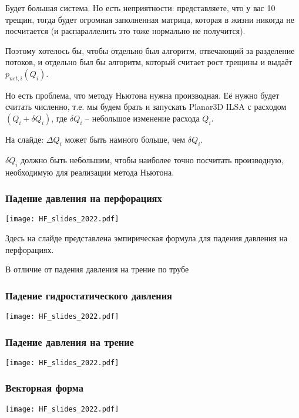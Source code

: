 \documentclass[main.tex]{subfiles}
\begin{document}
Будет большая система.
Но есть неприятности: представляете, что у вас 10 трещин, тогда будет огромная заполненная матрица, которая в жизни никогда не посчитается (и распараллелить это тоже нормально не получится).

Поэтому хотелось бы, чтобы отдельно был алгоритм, отвечающий за разделение потоков, и отдельно был бы алгоритм, который считает рост трещины и выдаёт $p_{net,i}(Q_i)$.

Но есть проблема, что методу Ньютона нужна производная.
Её нужно будет считать численно, т.е. мы будем брать и запускать Planar3D ILSA с расходом $\left(Q_i+\delta Q_i\right)$, где $\delta Q_i$ -- небольшое изменение расхода $Q_i$.

На слайде: $\Delta Q_i$ может быть намного больше, чем $\delta Q_i$.

$\delta Q_i$ должно быть небольшим, чтобы наиболее точно посчитать производную, необходимую для реализации метода Ньютона.

\subsubsection{Падение давления на перфорациях}

\texttt{[image: HF\_slides\_2022.pdf]}

Здесь на слайде представлена эмпирическая формула для падения давления на перфорациях.

В отличие от падения давления на трение по трубе

\subsubsection{Падение гидростатического давления}

\texttt{[image: HF\_slides\_2022.pdf]}

\subsubsection{Падение давления на трение}

\texttt{[image: HF\_slides\_2022.pdf]}

\subsubsection{Векторная форма}

\texttt{[image: HF\_slides\_2022.pdf]}
\end{document}
